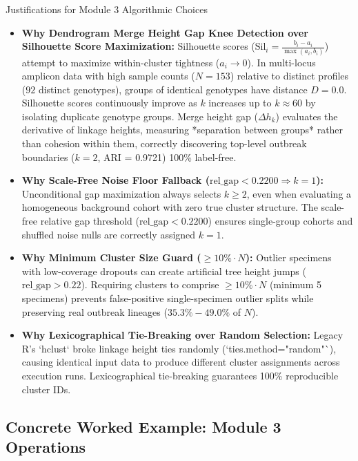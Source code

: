 \documentclass[11pt,a4paper]{article}
\begin{document}
\begin{conceptbox}{Justifications for Module 3 Algorithmic Choices}
\begin{itemize}[leftmargin=*]
    \item \textbf{Why Dendrogram Merge Height Gap Knee Detection over Silhouette Score Maximization:} Silhouette scores ($\text{Sil}_i = \frac{b_i - a_i}{\max(a_i, b_i)}$) attempt to maximize within-cluster tightness ($a_i \to 0$). In multi-locus amplicon data with high sample counts ($N=153$) relative to distinct profiles ($92$ distinct genotypes), groups of identical genotypes have distance $D=0.0$. Silhouette scores continuously improve as $k$ increases up to $k \approx 60$ by isolating duplicate genotype groups. Merge height gap ($\Delta h_k$) evaluates the derivative of linkage heights, measuring *separation between groups* rather than cohesion within them, correctly discovering top-level outbreak boundaries ($k=2$, ARI = 0.9721) 100\% label-free.
    \item \textbf{Why Scale-Free Noise Floor Fallback ($\text{rel\_gap} < 0.2200 \Rightarrow k=1$):} Unconditional gap maximization always selects $k \ge 2$, even when evaluating a homogeneous background cohort with zero true cluster structure. The scale-free relative gap threshold ($\text{rel\_gap} < 0.2200$) ensures single-group cohorts and shuffled noise nulls are correctly assigned $k=1$.
    \item \textbf{Why Minimum Cluster Size Guard ($\ge 10\% \cdot N$):} Outlier specimens with low-coverage dropouts can create artificial tree height jumps ($\text{rel\_gap} > 0.22$). Requiring clusters to comprise $\ge 10\% \cdot N$ (minimum 5 specimens) prevents false-positive single-specimen outlier splits while preserving real outbreak lineages ($35.3\% - 49.0\%$ of $N$).
    \item \textbf{Why Lexicographical Tie-Breaking over Random Selection:} Legacy R's `hclust` broke linkage height ties randomly (`ties.method="random"`), causing identical input data to produce different cluster assignments across execution runs. Lexicographical tie-breaking guarantees 100\% reproducible cluster IDs.
\end{itemize}
\end{conceptbox}

\subsection{Concrete Worked Example: Module 3 Operations}
\end{document}
